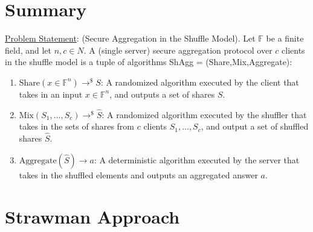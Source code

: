 
\clearpage
{}

%
\setcounter{section}{0} %

\section{Summary}
\underline{Problem Statement}: (Secure Aggregation in the Shuffle Model). Let $\mathbb{F}$ be a finite field, and let $n,c \in N$. A (single server) secure aggregation protocol over $c$ clients in the shuffle model is a tuple of algorithms ShAgg = (Share,Mix,Aggregate):
\begin{enumerate}
    \item $\text{Share}(x \in \mathbb{F}^n) \rightarrow^\$ S$: A randomized algorithm executed by the client that takes in an input $x \in \mathbb{F}^n$, and
    outputs a set of shares $S$.
    \item $\text{Mix}(S_1, \dots ,S_c) \rightarrow^\$ \hat{S}$: A randomized algorithm executed by the shuffler that takes in the sets of shares from $c$ clients $S_1, \dots ,S_c$, and output a set of shuffled shares $\hat{S}$.
    \item $\text{Aggregate}(\hat{S}) \rightarrow a$: A deterministic algorithm executed by the server that takes in the shuffled elements and outputs an aggregated answer $a$.
\end{enumerate}

\section{Strawman Approach}

